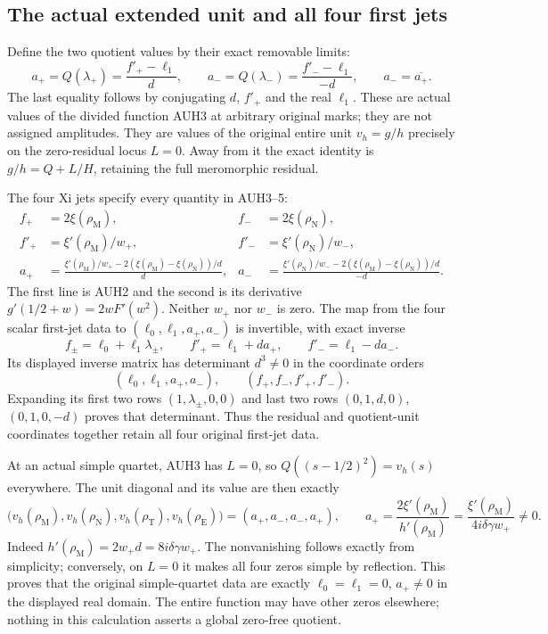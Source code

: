 \subsection{The actual extended unit and all four first jets}

Define the two quotient values by their exact removable limits:
\[
 a_+=Q(\lambda_+)=\frac{f'_+-\ell_1}{d},\qquad
 a_-=Q(\lambda_-)=\frac{f'_--\ell_1}{-d},\qquad
 a_-=\overline{a_+}.
 \tag{AUH5}
\]
The last equality follows by conjugating $d$, $f'_+$ and the real
$\ell_1$.  These are actual values of the divided function AUH3 at
arbitrary original marks; they are not assigned amplitudes.
They are values of the original entire unit $v_h=g/h$ precisely on
the zero-residual locus $L=0$.  Away from it the exact identity is
$g/h=Q+L/H$, retaining the full meromorphic residual.

The four Xi jets specify every quantity in AUH3--5:
\[
\begin{aligned}
 f_+&=2\xi(\rho_{\mathrm M}),&f_-&=2\xi(\rho_{\mathrm N}),\\
 f'_+&=\xi'(\rho_{\mathrm M})/w_+,&
 f'_-&=\xi'(\rho_{\mathrm N})/w_-,\\
 a_+&=\frac{\xi'(\rho_{\mathrm M})/w_+
       -2(\xi(\rho_{\mathrm M})-\xi(\rho_{\mathrm N}))/d}{d},&
 a_-&=\frac{\xi'(\rho_{\mathrm N})/w_-
       -2(\xi(\rho_{\mathrm M})-\xi(\rho_{\mathrm N}))/d}{-d}.
\end{aligned}\tag{AUH6}
\]
The first line is AUH2 and the second is its derivative
$g'(1/2+w)=2wF'(w^2)$.  Neither $w_+$ nor $w_-$ is zero.
The map from the four scalar first-jet data to
$(\ell_0,\ell_1,a_+,a_-)$ is invertible, with exact inverse
\[
 f_\pm=\ell_0+\ell_1\lambda_\pm,\qquad
 f'_+=\ell_1+d a_+,\qquad f'_-=\ell_1-d a_-.
 \tag{AUH7}
\]
Its displayed inverse matrix has determinant $d^3\ne0$ in the
coordinate orders
\[
 (\ell_0,\ell_1,a_+,a_-),\qquad (f_+,f_-,f'_+,f'_-).
\]
Expanding its first two rows $(1,\lambda_\pm,0,0)$ and last two
rows $(0,1,d,0)$, $(0,1,0,-d)$ proves that determinant.
Thus the residual and quotient-unit coordinates together retain
all four original first-jet data.

At an actual simple quartet, AUH3 has $L=0$, so $Q((s-1/2)^2)=v_h(s)$
everywhere.  The unit diagonal and its value are then exactly
\[
 \bigl(v_h(\rho_{\mathrm M}),v_h(\rho_{\mathrm N}),
        v_h(\rho_{\mathrm T}),v_h(\rho_{\mathrm E})\bigr)
       =(a_+,a_-,a_-,a_+),\qquad
 a_+=\frac{2\xi'(\rho_{\mathrm M})}{h'(\rho_{\mathrm M})}
     =\frac{\xi'(\rho_{\mathrm M})}{4i\delta\gamma w_+}\ne0.
 \tag{AUH8}
\]
Indeed $h'(\rho_{\mathrm M})=2w_+d=8i\delta\gamma w_+$.
The nonvanishing follows exactly from simplicity; conversely, on
$L=0$ it makes all four zeros simple by reflection.
This proves that the original simple-quartet data are exactly
$\ell_0=\ell_1=0$, $a_+\ne0$ in the displayed real domain.
The entire function may have other zeros elsewhere; nothing in
this calculation asserts a global zero-free quotient.

